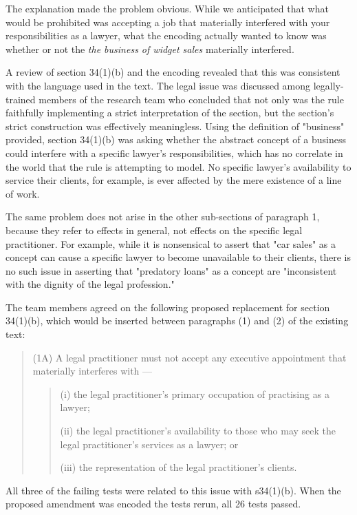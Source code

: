 \documentclass[sigconf]{acmart}
\begin{document}
The explanation made the
problem obvious. While we anticipated that what would be prohibited was accepting a job that materially interfered with your responsibilities
as a lawyer, what the encoding actually wanted to know was whether
or not the \textit{the business of widget sales} materially interfered.

A review of section 34(1)(b) and the encoding revealed that this was consistent
with the language used in the text. The legal issue was discussed among legally-trained members of
the research team who concluded that not only was the rule faithfully
implementing a strict interpretation of the section, but the section's strict construction was effectively meaningless.
Using the definition of "business" provided, section 34(1)(b) was asking whether the abstract concept of a business
could interfere with a specific lawyer's responsibilities, which has no correlate
in the world that the rule is attempting to model. No specific lawyer's availability
to service their clients, for example, is ever affected by the mere existence of a line
of work.

The same problem does not arise in the other sub-sections of paragraph 1, because
they refer to effects in general, not effects on the specific legal practitioner.
For example, while it is nonsensical to assert that "car sales" as a concept
can cause a specific lawyer to become unavailable to their clients, there is no such issue
in asserting that "predatory loans" as a concept are "inconsistent with
the dignity of the legal profession."

The team members agreed on the following proposed replacement for section 34(1)(b),
which would be inserted between paragraphs (1) and (2) of the existing text:

\begin{quote}
    (1A) A legal practitioner must not accept any executive appointment that materially interferes with —
    \begin{quote}
        (i)	the legal practitioner’s primary occupation of practising as a lawyer;

(ii)	the legal practitioner’s availability to those who may seek the legal practitioner’s 
services as a lawyer; or

(iii)	the representation of the legal practitioner’s clients.
    \end{quote}

\end{quote}

All three of the failing tests were related to this issue with s34(1)(b). 
When the proposed amendment was encoded the tests rerun, all 26 tests passed.
\end{document}
